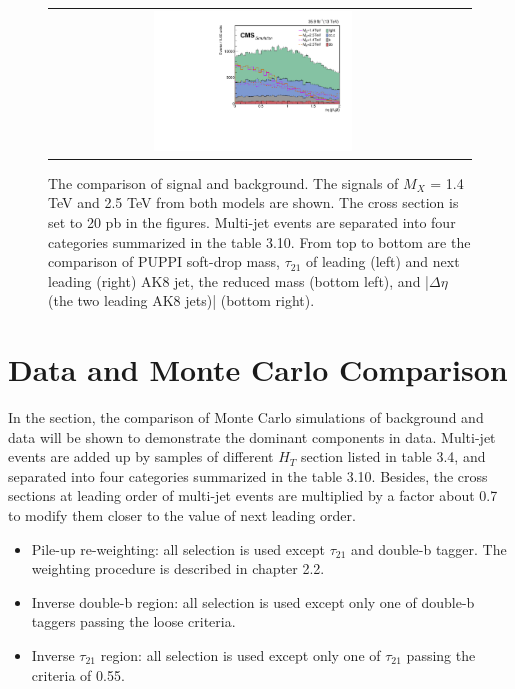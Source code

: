 \begin{figure}[t]
\begin{tabular}{cc}
    \includegraphics[width=0.5\textwidth]{Figures/MC_N1/deltaEta.pdf} \\
  \end{tabular}
  \caption{The comparison of signal and background. The signals of $M_{X}$ = 1.4 TeV and 2.5 TeV from both models are shown. The cross section is set to 20 pb in the figures. Multi-jet events are separated into four categories summarized in the table 3.10. From top to bottom are the comparison of PUPPI soft-drop mass, $\tau _{21}$ of leading (left) and next leading (right) AK8 jet, the reduced mass (bottom left), and |$\Delta \eta $ (the two leading AK8 jets)| (bottom right).}
  \label{fig:hvt_brs}
\end{figure}

\section{Data and Monte Carlo Comparison} 
In the section, the comparison of Monte Carlo simulations of background and data will be shown to demonstrate the dominant components in data. Multi-jet events are added up by samples of different $H_T$ section listed in table 3.4, and separated into four categories summarized in the table 3.10. Besides, the cross sections at leading order of multi-jet events are multiplied by a factor about 0.7 to modify them closer to the value of next leading order.


\begin{itemize}
\item Pile-up re-weighting: all selection is used except $\tau _{21}$ and double-b tagger. The weighting procedure is described in chapter 2.2.
\item Inverse double-b region: all selection is used except only one of double-b taggers passing the loose criteria.
\item Inverse $\tau _{21}$ region: all selection is used except only one of $\tau _{21}$ passing the criteria of 0.55.
\end{itemize} 

